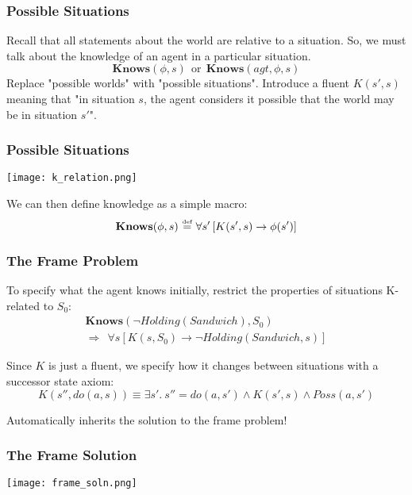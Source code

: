\documentclass{beamer}
\newcommand{\isdef}{\hbox{$\stackrel{\mbox{\tiny def}}{=}$}}
\begin{document}
\begin{frame}
\frametitle{Possible Situations}
Recall that all statements about the world are relative to a situation.
So, we must talk about the knowledge of an agent in a particular situation.
\begin{equation*}
\mathbf{Knows}(\phi,s)\ \ \mathrm{or}\ \ \mathbf{Knows}(agt,\phi,s)
\end{equation*}
\pause
Replace "possible worlds" with "possible situations".  Introduce a fluent
$K(s',s)$ meaning that "in situation $s$, the agent considers it possible
that the world may be in situation $s'$".
\end{frame}

\begin{frame}
\frametitle{Possible Situations}
\begin{center}
  \texttt{[image: k\_relation.png]}
\end{center}

We can then define knowledge as a simple macro:
\[ \mathbf{Knows}(\phi,s)\ \isdef\ \forall s'\left[K(s',s)\rightarrow \phi(s')\right] \]
\end{frame}

\begin{frame}
\frametitle{The Frame Problem}
To specify what the agent knows initially, restrict the properties of situations
K-related to $S_0$:
\begin{gather*}
  \mathbf{Knows}(\neg Holding(Sandwich),S_0) \\
  \Rightarrow \ \ \forall s \left[K(s,S_0) \rightarrow \neg Holding(Sandwich,s) \right]
\end{gather*}

\pause
Since $K$ is just a fluent, we specify how it changes  between situations
with a successor state axiom:
\begin{equation*}
 K(s'',do(a,s)) \equiv \exists s' . \ s''=do(a,s')
 \wedge K(s',s) \wedge Poss(a,s')
\end{equation*}

Automatically inherits the solution to the frame problem!
\end{frame}

\begin{frame}
\frametitle{The Frame Solution}
\begin{center}
  \texttt{[image: frame\_soln.png]}
\end{center}
\end{frame}
\end{document}
